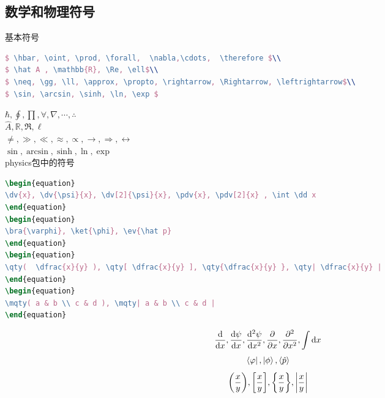 \documentclass[11pt,a4paper,onecolumn]{article}
\begin{document}
\subsection{数学和物理符号}

基本符号
\begin{lstlisting}[language=TeX]
$ \hbar, \oint, \prod, \forall,  \nabla,\cdots,  \therefore $\\
$ \hat A , \mathbb{R}, \Re, \ell$\\
$ \neq, \gg, \ll, \approx, \propto, \rightarrow, \Rightarrow, \leftrightarrow$\\
$ \sin, \arcsin, \sinh, \ln, \exp $
\end{lstlisting}
$ \hbar, \oint, \prod, \forall,  \nabla,\cdots,  \therefore $\\
$ \hat A , \mathbb{R}, \Re, \ell$\\
$ \neq, \gg, \ll, \approx, \propto, \rightarrow, \Rightarrow, \leftrightarrow$\\
$ \sin, \arcsin, \sinh, \ln, \exp $
\\

physics包中的符号
\begin{lstlisting}[language=TeX]
\begin{equation}
\dv{x}, \dv{\psi}{x}, \dv[2]{\psi}{x}, \pdv{x}, \pdv[2]{x} , \int \dd x
\end{equation}
\begin{equation}
\bra{\varphi}, \ket{\phi}, \ev{\hat p}
\end{equation}  
\begin{equation}
\qty(  \dfrac{x}{y} ), \qty[ \dfrac{x}{y} ], \qty{\dfrac{x}{y} }, \qty| \dfrac{x}{y} |
\end{equation}
\begin{equation}
\mqty( a & b \\ c & d ), \mqty| a & b \\ c & d |
\end{equation}
\end{lstlisting}
\begin{equation}\label{key}
 \dv{x}, \dv{\psi}{x}, \dv[2]{\psi}{x}, \pdv{x}, \pdv[2]{x} , \int \dd x
\end{equation}
\begin{equation}\label{key}
\bra{\varphi}, \ket{\phi}, \ev{\hat p}
\end{equation}  
\begin{equation}\label{key}
\qty(  \dfrac{x}{y} ), \qty[ \dfrac{x}{y} ], \qty{\dfrac{x}{y} }, \qty| \dfrac{x}{y} |
\end{equation}
\end{document}
